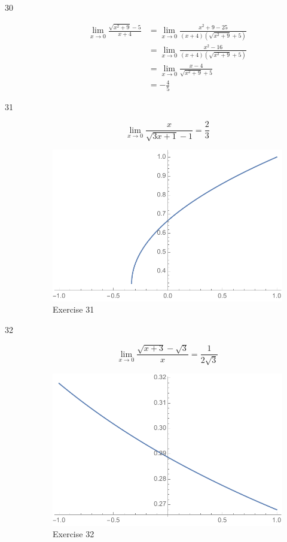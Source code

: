 \documentclass[letterpaper, landscape]{exam}
\begin{document}
\begin{description}
      \item[30]
        \begin{align*}
          \lim_{x \to 0} \frac{\sqrt{x^2+9}-5}{x+4} 
            &= \lim_{x \to 0} \frac{x^2+9-25}{\left(x+4\right) \left(\sqrt{x^2+9}+5 \right)} \\
            & = \lim_{x \to 0} \frac{x^2-16}{\left(x+4\right) \left(\sqrt{x^2+9}+5 \right)} \\
            & = \lim_{x \to 0} \frac{x-4}{\sqrt{x^2+9}+5} \\
            & = \boxed{ - \frac{4}{5} }
        \end{align*}

      \item[31]
        \[
          \lim_{x \to 0}  \frac{x}{\sqrt{3 x+1}-1} = \boxed{ \frac{2}{3} }
        \]

        \begin{figure}[H]
          \centering
          \includegraphics[scale = 0.5]{ex31.pdf}
          \caption{Exercise 31}
          \label{fig:ex31}
        \end{figure}
      \item[32]
        \[
          \lim_{x \to 0} \frac{\sqrt{x+3}-\sqrt{3}}{x} = \boxed{ \frac{1}{2 \sqrt{3}} } 
        \]

        \begin{figure}[H]
          \centering
          \includegraphics[scale = 0.5]{ex32.pdf}
          \caption{Exercise 32}
          \label{fig:ex32}
        \end{figure}



\end{description}
\end{document}
